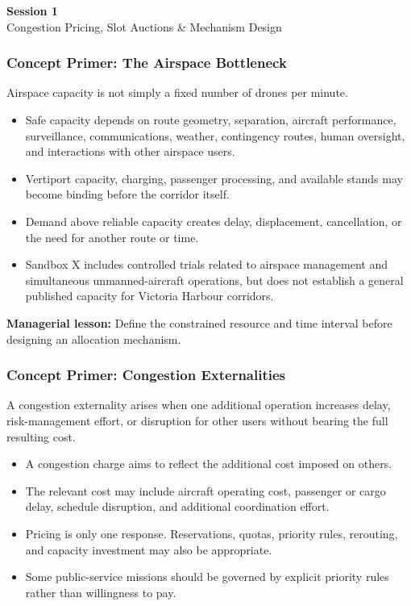 \documentclass{beamer}
\begin{document}
\begin{frame}[c]
  \begin{center}
    \huge\color{cuhkpurple}\textbf{Session 1}\\
    \vspace{0.5cm}
    \Large Congestion Pricing, Slot Auctions \& Mechanism Design
  \end{center}
\end{frame}

\begin{frame}[t]
\frametitle{Concept Primer: The Airspace Bottleneck}
Airspace capacity is not simply a fixed number of drones per minute.
\begin{itemize}
\item Safe capacity depends on route geometry, separation, aircraft performance, surveillance, communications, weather, contingency routes, human oversight, and interactions with other airspace users.
\item Vertiport capacity, charging, passenger processing, and available stands may become binding before the corridor itself.
\item Demand above reliable capacity creates delay, displacement, cancellation, or the need for another route or time.
\item Sandbox X includes controlled trials related to airspace management and simultaneous unmanned-aircraft operations, but does not establish a general published capacity for Victoria Harbour corridors.
\end{itemize}
\textbf{Managerial lesson:} Define the constrained resource and time interval before designing an allocation mechanism.
\end{frame}

\begin{frame}[t]
\frametitle{Concept Primer: Congestion Externalities}
A congestion externality arises when one additional operation increases delay, risk-management effort, or disruption for other users without bearing the full resulting cost.
\begin{itemize}
\item A congestion charge aims to reflect the additional cost imposed on others.
\item The relevant cost may include aircraft operating cost, passenger or cargo delay, schedule disruption, and additional coordination effort.
\item Pricing is only one response. Reservations, quotas, priority rules, rerouting, and capacity investment may also be appropriate.
\item Some public-service missions should be governed by explicit priority rules rather than willingness to pay.
\end{itemize}
\end{frame}
\end{document}
